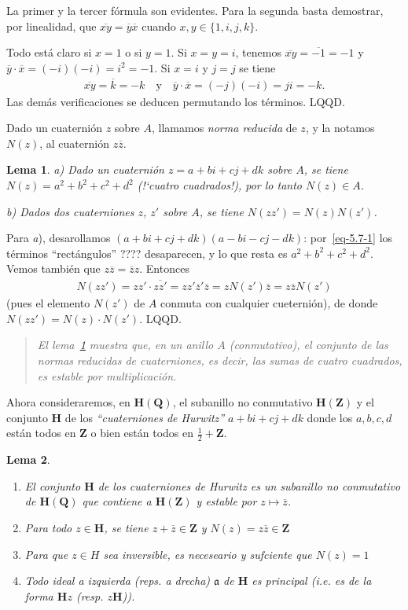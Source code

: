 \documentclass[bibtotoc,leqno,spanish]{amsbook}
\newcommand{\QQ}{\mathbf{Q}}
\newcommand{\ZZ}{\mathbf{Z}}
\newcommand{\HH}{\mathbf{H}}
\newcommand{\idl}[1]{\mathfrak{#1}}
\newcommand{\QED}{LQQD.}
\newcommand{\oline}[1]{\overline{#1}}
\numberwithin{equation}{section}
\newenvironment{comm}%
	{\begin{quotation}\itshape\Small}
	{\end{quotation}}
\theoremstyle{note}
\theoremstyle{note}
\newtheorem{lemma}{Lema}
\theoremstyle{rem}
\numberwithin{theorem}{section}
\numberwithin{proposition}{section}
\numberwithin{definition}{section}
\numberwithin{lemma}{section}
\numberwithin{corollary}{section}
\numberwithin{example}{section}
\numberwithin{footnote}{section}%
\begin{document}
La primer y la tercer f\'ormula son evidentes. Para la segunda basta demostrar, por linealidad,
que $\oline{xy} = \oline{y}\oline x$ cuando $x,y\in\{1,i,j,k\}$.

Todo est\'a claro si $x=1$ o si $y=1$. Si $x=y=i$, tenemos $\oline{xy} = \oline{-1}=-1$ y
$\oline y\cdot\oline x = (-i)(-i) = i^{2}=-1$. Si $x=i$ y $j=j$ se tiene
\begin{gather*}
\oline{xy} = \oline k = -k\quad\text{y}\quad\oline y\cdot\oline x = (-j)(-i) = ji = -k.
\end{gather*}
Las dem\'as verificaciones se deducen permutando los t\'erminos. \QED

Dado un cuaterni\'on $z$ sobre $A$, llamamos {\em norma reducida} de $z$, y la notamos
$N(z)$, al cuaterni\'on $z\oline z$.

\begin{lemma}\label{lem5.7.2}
a) Dado un cuaterni\'on $z = a+bi+cj+dk$ sobre $A$, se tiene
$N(z) = a^{2}+b^{2}+c^{2}+d^{2}$ (!`cuatro cuadrados!), por lo tanto $N(z)\in A$.

b) Dados dos cuaterniones $z$, $z'$ sobre $A$, se tiene $N(zz') = N(z)N(z')$.
\end{lemma}

Para {\itshape a}), desarollamos $(a+bi+cj+dk)(a-bi-cj-dk)$: por~\eqref{eq-5.7-1} los t\'erminos
``rect\'angulos'' ???? desaparecen, y lo que resta es $a^{2}+b^{2}+c^{2}+d^{2}$. Vemos tambi\'en que
$z\oline z = \oline z z$. Entonces
\begin{gather*}
N(zz') = zz'\cdot\oline{zz'} = zz'\oline z'\oline z = zN(z')\oline z = z\oline zN(z')
\end{gather*}
(pues el elemento $N(z')$ de $A$ conmuta con cualquier cueterni\'on), de donde $N(zz') = N(z)\cdot N(z')$. \QED

\begin{comm}
El lema~\ref{lem5.7.2} muestra que, en un anillo $A$ (conmutativo), el conjunto de las normas reducidas de cuaterniones,
es decir, las sumas de cuatro cuadrados, es estable por multiplicaci\'on.
\end{comm}

Ahora consideraremos, en $\HH(\QQ)$, el subanillo no conmutativo $\HH(\ZZ)$ y el conjunto $\HH$ de los
{\em ``cuaterniones de Hurwitz''} $a+bi+cj+dk$ donde los $a, b, c, d$ est\'an todos en $\ZZ$ o
bien est\'an todos en $\frac{1}{2}+\ZZ$.

\begin{lemma}
\begin{enumerate}
\item El conjunto $\HH$ de los cuaterniones de Hurwitz es un subanillo no conmutativo de $\HH(\QQ)$ que
contiene a $\HH(\ZZ)$ y estable por $z\mapsto\oline z$.
\item Para todo $z\in\HH$, se tiene $z+\oline z\in\ZZ$ y $N(z) = z\oline z\in\ZZ$
\item Para que $z\in H$ sea inversible, es neceseario y sufciente que $N(z) = 1$
\item Todo ideal a izquierda (reps. a drecha) $\idl{a}$ de $\HH$ es principal (i.e. es de la forma
$\HH z$ (resp. $z\HH$)).
\end{enumerate}
\end{lemma}
\end{document}
